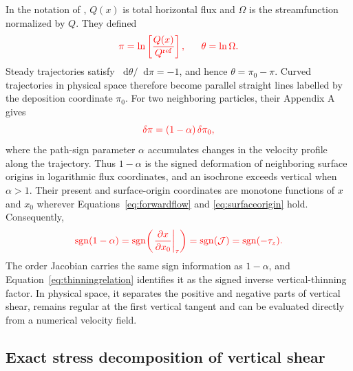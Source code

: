 \documentclass[review]{igs}
\providecommand{\DIFdel}[1]{{\protect\color{red} \scriptsize #1}} %
\providecommand{\DIFdelbegin}{} %
\providecommand{\DIFdelend}{} %
\newcommand{\DIFscaledelfig}{0.5}
\newlength{\DIFdelgraphicswidth} %
\newlength{\DIFdelgraphicsheight} %
\newcommand{\DIFdelincludegraphics}[2][]{%
\sbox{\DIFdelgraphicsbox}{\DIFOincludegraphics[#1]{#2}}%
\settoboxwidth{\DIFdelgraphicswidth}{\DIFdelgraphicsbox} %
\settoboxtotalheight{\DIFdelgraphicsheight}{\DIFdelgraphicsbox} %
\scalebox{\DIFscaledelfig}{%
\parbox[b]{\DIFdelgraphicswidth}{\usebox{\DIFdelgraphicsbox}\\[-\baselineskip] \rule{\DIFdelgraphicswidth}{0em}}\llap{\resizebox{\DIFdelgraphicswidth}{\DIFdelgraphicsheight}{%
\setlength{\unitlength}{\DIFdelgraphicswidth}%
\begin{picture}(1,1)%
\thicklines\linethickness{2pt} %
{\color[rgb]{1,0,0}\put(0,0){\framebox(1,1){}}}%
{\color[rgb]{1,0,0}\put(0,0){\line( 1,1){1}}}%
{\color[rgb]{1,0,0}\put(0,1){\line(1,-1){1}}}%
\end{picture}%
}\hspace*{3pt}}} %
} %
\DeclareRobustCommand{\DIFdelbegin}{\DIFOdelbegin \let\includegraphics\DIFdelincludegraphics} %
\DeclareRobustCommand{\DIFdelend}{\DIFOaddend \let\includegraphics\DIFOincludegraphics} %
\begin{document}
\DIFdelbegin \DIFdel{In the notation of \citet{ParreninHindmarsh2007}, \(Q(x)\) is total horizontal flux and \(\Omega\) is the streamfunction normalized by \(Q\). They defined
}\begin{displaymath}
\DIFdel{\pi=\ln\left[\frac{Q(x)}{Q^{\mathrm{ref}}}\right],
\qquad
\theta=\ln\Omega.
}\end{displaymath}%
\DIFdel{Steady trajectories satisfy \(\mathop{}\!\mathrm{d}\theta/\mathop{}\!\mathrm{d}\pi=-1\), and hence \(\theta=\pi_0-\pi\). Curved trajectories in physical space therefore become parallel straight lines labelled by the deposition coordinate \(\pi_0\). For two neighboring particles, their Appendix A gives
}\begin{displaymath}
\DIFdel{\delta\pi=(1-\alpha)\,\delta\pi_0,
}\end{displaymath}%
\DIFdel{where the path-sign parameter \(\alpha\) accumulates changes in the velocity profile along the trajectory. Thus \(1-\alpha\) is the signed deformation of neighboring surface origins in logarithmic flux coordinates, and an isochrone exceeds vertical when \(\alpha>1\). Their present and surface-origin coordinates are monotone functions of \(x\) and \(x_0\) wherever Equations~\ref{eq:forwardflow} and \ref{eq:surfaceorigin} hold. Consequently,
}\begin{displaymath}
\DIFdel{\operatorname{sgn}(1-\alpha)
=\operatorname{sgn}\!\left(
\left.\frac{\partial x}{\partial x_0}\right|_{\tau}
\right)
=\operatorname{sgn}(\mathcal{J})
=\operatorname{sgn}(-\tau_z).
}\end{displaymath}%
\DIFdel{The order Jacobian carries the same sign information as \(1-\alpha\), and Equation~\ref{eq:thinningrelation} identifies it as the signed inverse vertical-thinning factor. In physical space, it separates the positive and negative parts of vertical shear, remains regular at the first vertical tangent and can be evaluated directly from a numerical velocity field.
}%


\DIFdelend \subsection{Exact stress decomposition of vertical shear}
\end{document}
